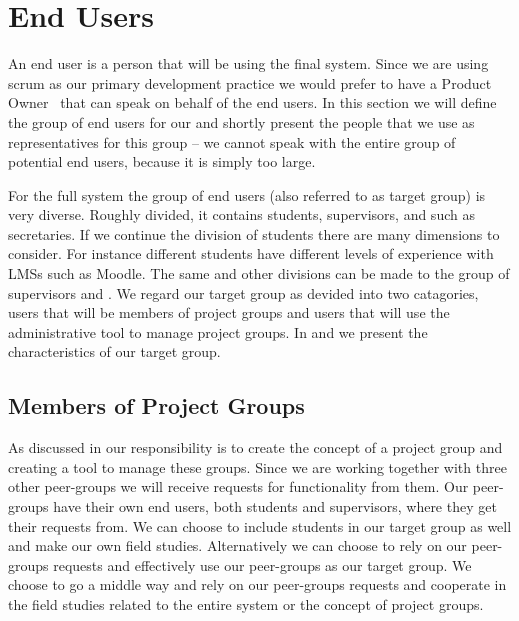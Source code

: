 \section{End Users}
\label{sec:enduser}
An end user is a person that will be using the final system.
Since we are using scrum as our primary development practice we would prefer to have a Product Owner~\cite[p.~115]{Larman04} that can speak on behalf of the end users.
In this section we will define the group of end users for our \subsystem{} and shortly present the people that we use as representatives for this group -- we cannot speak with the entire group of potential end users, because it is simply too large.

For the full system the group of end users (also referred to as target group) is very diverse.
Roughly divided, it contains students, supervisors, and \admpers{} such as secretaries.
If we continue the division of students there are many dimensions to consider. 
For instance different students have different levels of experience with LMSs such as Moodle.
The same and other divisions can be made to the group of supervisors and \admpers{}.
We regard our target group as devided into two catagories, users that will be members of project groups and users that will use the administrative tool to manage project groups.
In  and  we present the characteristics of our target group.

\subsection{Members of Project Groups}
\label{sub:endusersmembers}
As discussed in  our responsibility is to create the concept of a project group and creating a tool to manage these groups.
Since we are working together with three other peer-groups we will receive requests for functionality from them.
Our peer-groups have their own end users, both students and supervisors, where they get their requests from.
We can choose to include students in our target group as well and make our own field studies.
Alternatively we can choose to rely on our peer-groups requests and effectively use our peer-groups as our target group.
We choose to go a middle way and rely on our peer-groups requests and cooperate in the field studies related to the entire system or the concept of project groups.

